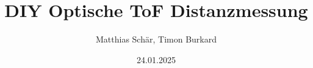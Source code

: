 \documentclass[aspectratio=169]{beamer}
\title{DIY Optische ToF Distanzmessung}
\author{Matthias Schär, Timon Burkard}
\institute{OST -- Ostschweizer Fachhochschule}
\date{24.01.2025}
\begin{document}






\miniframesoff

\questions{}


\end{document}
